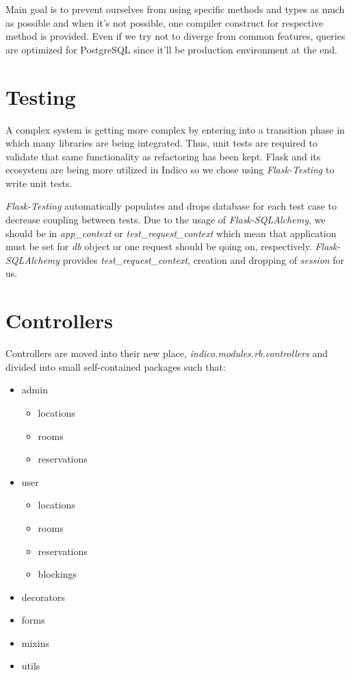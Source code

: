 Main goal is to prevent ourselves from using specific methods and types as much as possible and when it's not possible, one compiler construct for respective method is provided. Even if we try not to diverge from common features, queries are optimized for PostgreSQL since it'll be production environment at the end.

\section{Testing}

A complex system is getting more complex by entering into a transition phase in which many libraries are being integrated. Thus, unit tests are required to validate that same functionality as refactoring has been kept. Flask and its ecosystem are being more utilized in Indico so we chose using \textit{Flask-Testing} to write unit tests.

\textit{Flask-Testing} automatically populates and drops database for each test case to decrease coupling between tests. Due to the usage of \textit{Flask-SQLAlchemy}, we should be in \textit{app\_context} or \textit{test\_request\_context} which mean that application must be set for \textit{db} object or one request should be qoing on, respectively. \textit{Flask-SQLAlchemy} provides \textit{test\_request\_context}, creation and dropping of \textit{session} for us.

\section{Controllers}

Controllers are moved into their new place, \textit{indico.modules.rb.controllers} and divided into small self-contained packages such that:
\begin{itemize}
  \item admin
    \begin{itemize}
      \item locations
      \item rooms
      \item reservations
    \end{itemize}
  \item user
    \begin{itemize}
      \item locations
      \item rooms
      \item reservations
      \item blockings
    \end{itemize}
  \item decorators
  \item forms
  \item mixins
  \item utils
\end{itemize}


